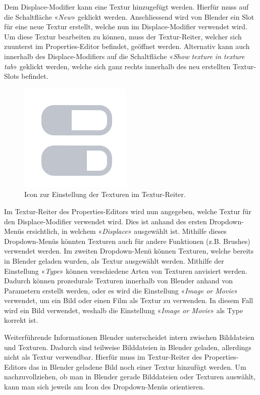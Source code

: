 \documentclass[
]{book}
\let\oldmarginnote\marginnote
\renewcommand{\marginnote}[1]{%
  \oldmarginnote{{\footnotesize\selectfont #1}}%
}
\begin{document}
Dem Displace-Modifier kann eine Textur hinzugefügt werden. Hierfür muss
auf die Schaltfläche «\emph{New}» geklickt werden. Anschliessend wird
von Blender ein Slot für eine neue Textur erstellt, welche nun im
Displace-Modifier verwendet wird. Um diese Textur bearbeiten zu können,
muss der Textur-Reiter, welcher sich zuunterst im Properties-Editor
befindet, geöffnet werden. Alternativ kann auch innerhalb des
Displace-Modifiers auf die Schaltfläche «\emph{Show texture in texture
tab}» geklickt werden, welche sich ganz rechts innerhalb des neu
erstellten Textur-Slots befindet.

\begin{figure}

\includegraphics{Chapters/Images/Chapter_28/28_3_Icon_Show_texture_in_Texture_Tab.png}

\caption{\label{fig-1_3}Icon zur Einstellung der Texturen im
Textur-Reiter.}

\end{figure}%

\marginnote{Einstellungen im Textur-Reiter}

Im Textur-Reiter des Properties-Editors wird nun angegeben, welche
Textur für den Displace-Modifier verwendet wird. Dies ist anhand des
ersten Dropdown-Menüs ersichtlich, in welchem «\emph{Displace}»
ausgewählt ist. Mithilfe dieses Dropdown-Menüs könnten Texturen auch für
andere Funktionen (z.B. Brushes) verwendet werden. Im zweiten
Dropdown-Menü können Texturen, welche bereits in Blender geladen wurden,
als Textur ausgewählt werden. Mithilfe der Einstellung «\emph{Type}»
können verschiedene Arten von Texturen anvisiert werden. Dadurch können
prozedurale Texturen innerhalb von Blender anhand von Parametern
erstellt werden, oder es wird die Einstellung «\emph{Image or Movie}»
verwendet, um ein Bild oder einen Film als Textur zu verwenden. In
diesem Fall wird ein Bild verwendet, weshalb die Einstellung
«\emph{Image or Movie}» als Type korrekt ist.

\begin{tipp}{Weiterführende Informationen}
Blender unterscheidet intern zwischen Bilddateien und Texturen. Dadurch sind teilweise Bilddateien in Blender geladen, allerdings nicht als Textur verwendbar. Hierfür muss im Textur-Reiter des Properties-Editors das in Blender geladene Bild noch einer Textur hinzufügt werden. Um nachzuvollziehen, ob man in Blender gerade Bilddateien oder Texturen auswählt, kann man sich jeweils am Icon des Dropdown-Menüs orientieren.
\end{tipp}
\end{document}
